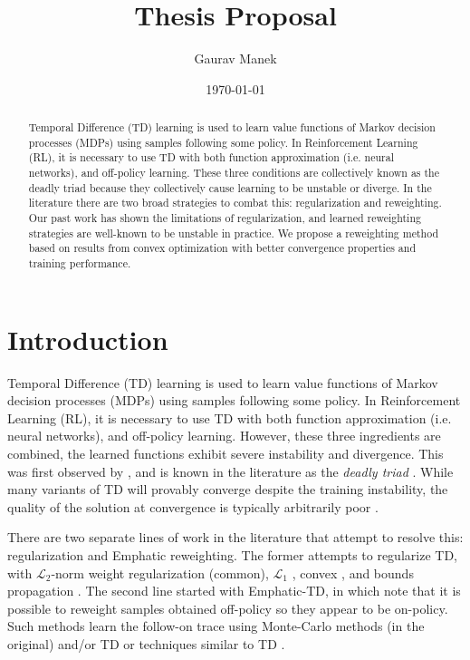 \documentclass[11pt]{article}
\title{ Thesis Proposal }
\author{ Gaurav Manek }
\date{\today}
\begin{document}
\maketitle

\begin{abstract}
Temporal Difference (TD) learning is used to learn value functions of Markov decision processes (MDPs) using samples following some policy. In Reinforcement Learning (RL), it is necessary to use TD with both function approximation (i.e. neural networks), and off-policy learning. These three conditions are collectively known as the deadly triad because they collectively cause learning to be unstable or diverge. In the literature there are two broad strategies to combat this: regularization and reweighting. Our past work has shown the limitations of regularization, and learned reweighting strategies are well-known to be unstable in practice. We propose a reweighting method based on results from convex optimization with better convergence properties and training performance.
\end{abstract}

\section{Introduction}

Temporal Difference (TD) learning is used to learn value functions of Markov decision processes (MDPs) using samples following some policy. In Reinforcement Learning (RL), it is necessary to use TD with both function approximation (i.e. neural networks), and off-policy learning. However, these three ingredients are combined, the learned functions exhibit severe instability and divergence. This was first observed by \citet{tsitsiklis1996analysis}, and is known in the literature as the \emph{deadly triad} \cite[p.~264]{sutton2020reinforcement}. While many variants of TD will provably converge despite the training instability, the quality of the solution at convergence is typically arbitrarily poor \citep{kolter2011fixed}.

There are two separate lines of work in the literature that attempt to resolve this: regularization and Emphatic reweighting.
The former attempts to regularize TD, with $\mathcal L_2$-norm weight regularization (common), $\mathcal L_1$ \citep{mahadevan2014proximal}, convex \citep{yu2017convergence}, and bounds propagation \citep{kumar2020discor}.
The second line started with Emphatic-TD, in which \citet{sutton2016emphatic} note that it is possible to reweight samples obtained off-policy so they appear to be on-policy. Such methods learn the follow-on trace using Monte-Carlo methods (in the original) and/or TD \citep{jiang2021learning,zhang2020provably} or techniques similar to TD \citep{hasselt2021expected}.
\end{document}
